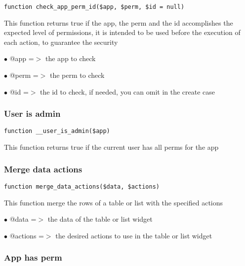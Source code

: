 \documentclass[a4paper]{article}
\begin{document}
\begin{lstlisting}
function check_app_perm_id($app, $perm, $id = null)
\end{lstlisting}

This function returns true if the app, the perm and the id accomplishes the
expected level of permissions, it is intended to be used before the execution
of each action, to guarantee the security

\begin{compactitem}
\item[\color{myblue}$\bullet$] @app  =$>$ the app to check
\item[\color{myblue}$\bullet$] @perm =$>$ the perm to check
\item[\color{myblue}$\bullet$] @id   =$>$ the id to check, if needed, you can omit in the create case
\end{compactitem}

\hypertarget{toc198}{}
\subsubsection{User is admin}

\begin{lstlisting}
function __user_is_admin($app)
\end{lstlisting}

This function returns true if the current user has all perms for the app

\hypertarget{toc199}{}
\subsubsection{Merge data actions}

\begin{lstlisting}
function merge_data_actions($data, $actions)
\end{lstlisting}

This function merge the rows of a table or list with the specified actions

\begin{compactitem}
\item[\color{myblue}$\bullet$] @data    =$>$ the data of the table or list widget
\item[\color{myblue}$\bullet$] @actions =$>$ the desired actions to use in the table or list widget
\end{compactitem}

\hypertarget{toc200}{}
\subsubsection{App has perm}
\end{document}
